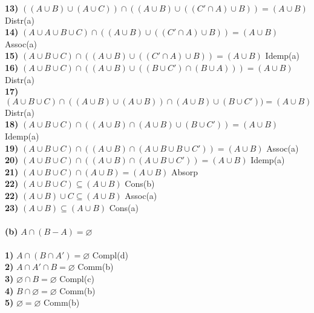 \documentclass{article}
\begin{document}
\textbf{13)} $((A \cup B) \cup (A \cup C)) \cap ((A \cup B) \cup ((C' \cap A) \cup B)) = (A \cup B)$\hspace*{\fill} Distr(a) \\
\textbf{14)} $(A \cup A \cup B \cup C)  \cap ((A \cup B) \cup ((C' \cap A) \cup B)) = (A \cup B)$\hspace*{\fill} Assoc(a)\\
\textbf{15)} $(A \cup B \cup C)  \cap ((A \cup B) \cup ((C' \cap A) \cup B)) = (A \cup B)$\hspace*{\fill} Idemp(a)\\
\textbf{16)} $(A \cup B \cup C)  \cap ((A \cup B) \cup ((B \cup C') \cap (B \cup A))) = (A \cup B)$\hspace*{\fill} Distr(a)\\
\textbf{17)} $(A \cup B \cup C)  \cap ((A \cup B) \cup (A \cup B)) \cap (A \cup B)\cup(B \cup C')) = (A \cup B)$\hspace*{\fill} Distr(a)\\
\textbf{18)} $(A \cup B \cup C)  \cap ((A \cup B) \cap (A \cup B)\cup(B \cup C')) = (A \cup B)$\hspace*{\fill} Idemp(a)\\
\textbf{19)} $(A \cup B \cup C)  \cap ((A \cup B) \cap (A \cup B\cup B \cup C')) = (A \cup B)$\hspace*{\fill} Assoc(a)\\
\textbf{20)} $(A \cup B \cup C)  \cap ((A \cup B) \cap (A \cup B \cup C')) = (A \cup B)$\hspace*{\fill} Idemp(a) \\
\textbf{21)} $(A \cup B \cup C)  \cap (A \cup B) = (A \cup B)$\hspace*{\fill} Absorp \\
\textbf{22)} $(A \cup B \cup C) \subseteq (A \cup B)$\hspace*{\fill} Cons(b)\\
\textbf{22)} $(A \cup B) \cup C \subseteq (A \cup B)$\hspace*{\fill} Assoc(a) \\
\textbf{23)} $(A \cup B) \subseteq (A \cup B)$\hspace*{\fill} Cons(a) \\
\\
\textbf{(b)} $A \cap (B - A) = \varnothing$ \\~\\
\textbf{1)} $A \cap (B \cap A')= \varnothing$ \hspace*{\fill} Compl(d) \\
\textbf{2)} $A \cap A'\cap B= \varnothing $ \hspace*{\fill} Comm(b) \\
\textbf{3)} $\varnothing \cap B= \varnothing $ \hspace*{\fill} Compl(c) \\
\textbf{4)} $B \cap \varnothing= \varnothing $ \hspace*{\fill} Comm(b) \\
\textbf{5)} $ \varnothing = \varnothing $ \hspace*{\fill} Comm(b) \\
\end{document}
